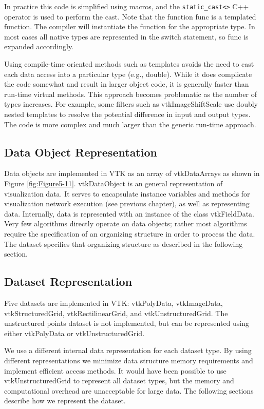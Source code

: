 In practice this code is simplified using macros, and the \texttt{static\_cast<>} C++ operator is used to perform the cast. Note that the function func is a templated function. The compiler will instantiate the function for the appropriate type. In most cases all native types are represented in the switch statement, so func is expanded accordingly.

Using compile-time oriented methods such as templates avoids the need to cast each data access into a particular type (e.g., double). While it does complicate the code somewhat and result in larger object code, it is generally faster than run-time virtual methods. This approach becomes problematic as the number of types increases. For example, some filters such as vtkImageShiftScale use doubly nested templates to resolve the potential difference in input and output types. The code is more complex and much larger than the generic run-time approach.

\subsection{Data Object Representation}

Data objects are implemented in VTK as an array of vtkDataArrays as shown in Figure \ref{fig:Figure5-11}. vtkDataObject is an general representation of visualization data. It serves to encapsulate instance variables and methods for visualization network execution (see previous chapter), as well as representing data. Internally, data is represented with an instance of the class vtkFieldData. Very few algorithms directly operate on data objects; rather most algorithms require the specification of an organizing structure in order to process the data. The dataset specifies that organizing structure as described in the following section.

\subsection{Dataset Representation}

Five datasets are implemented in VTK: vtkPolyData, vtkImageData, vtkStructuredGrid, vtkRectilinearGrid, and vtkUnstructuredGrid. The unstructured points dataset is not implemented, but can be represented using either vtkPolyData or vtkUnstructuredGrid.

We use a different internal data representation for each dataset type. By using different representations we minimize data structure memory requirements and implement efficient access methods. It would have been possible to use vtkUnstructuredGrid to represent all dataset types, but the memory and computational overhead are unacceptable for large data. The following sections describe how we represent the dataset.

